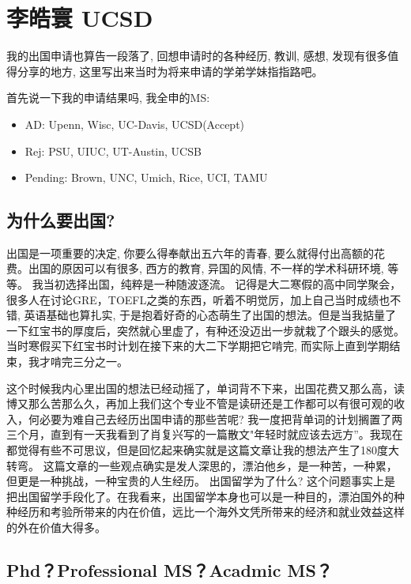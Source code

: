 \section{李皓寰 UCSD}
我的出国申请也算告一段落了, 回想申请时的各种经历, 教训, 感想, 发现有很多值得分享的地方, 这里写出来当时为将来申请的学弟学妹指指路吧。\par

       首先说一下我的申请结果吗, 我全申的MS: 
\begin{itemize}
\item        AD: Upenn, Wisc, UC-Davis, UCSD(Accept)
\item        Rej: PSU, UIUC, UT-Austin, UCSB
\item       Pending: Brown, UNC, Umich, Rice, UCI, TAMU
\end{itemize}


\subsection{为什么要出国?}

出国是一项重要的决定, 你要么得奉献出五六年的青春, 要么就得付出高额的花费。出国的原因可以有很多, 西方的教育, 异国的风情, 不一样的学术科研环境, 等等。 我当初选择出国，纯粹是一种随波逐流。 记得是大二寒假的高中同学聚会， 很多人在讨论GRE，TOEFL之类的东西，听着不明觉厉，加上自己当时成绩也不错, 英语基础也算扎实, 于是抱着好奇的心态萌生了出国的想法。但是当我掂量了一下红宝书的厚度后，突然就心里虚了，有种还没迈出一步就栽了个跟头的感觉。当时寒假买下红宝书时计划在接下来的大二下学期把它啃完, 而实际上直到学期结束，我才啃完三分之一。\par

这个时候我内心里出国的想法已经动摇了，单词背不下来，出国花费又那么高，读博又那么苦那么久，再加上我们这个专业不管是读研还是工作都可以有很可观的收入，何必要为难自己去经历出国申请的那些苦呢? 我一度把背单词的计划搁置了两三个月，直到有一天我看到了肖复兴写的一篇散文"年轻时就应该去远方”。我现在都觉得有些不可思议，但是回忆起来确实就是这篇文章让我的想法产生了180度大转弯。 这篇文章的一些观点确实是发人深思的，漂泊他乡，是一种苦，一种累，但更是一种挑战，一种宝贵的人生经历。 出国留学为了什么? 这个问题事实上是把出国留学手段化了。在我看来，出国留学本身也可以是一种目的，漂泊国外的种种经历和考验所带来的内在价值，远比一个海外文凭所带来的经济和就业效益这样的外在价值大得多。

\subsection{Phd？Professional MS？Acadmic MS？}

